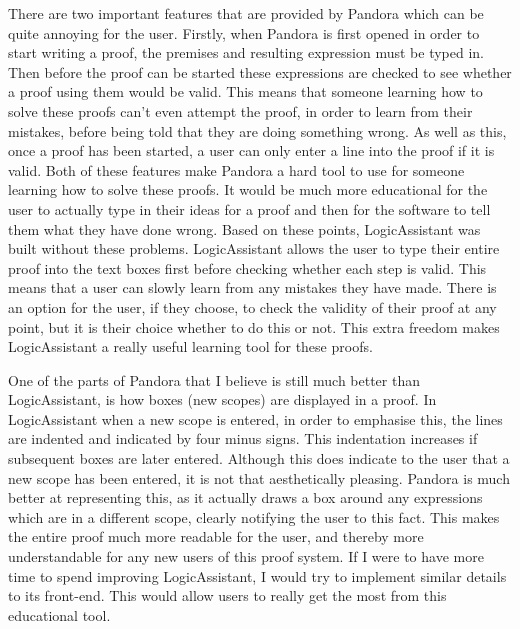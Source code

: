 There are two important features that are provided by Pandora which can be quite annoying for the user. Firstly, when Pandora is first opened in order to start writing a proof, the premises and resulting expression must be typed in. Then before the proof can be started these expressions are checked to see whether a proof using them would be valid. This means that someone learning how to solve these proofs can't even attempt the proof, in order to learn from their mistakes, before being told that they are doing something wrong. As well as this, once a proof has been started, a user can only enter a line into the proof if it is valid. Both of these features make Pandora a hard tool to use for someone learning how to solve these proofs. It would be much more educational for the user to actually type in their ideas for a proof and then for the software to tell them what they have done wrong. Based on these points, LogicAssistant was built without these problems. LogicAssistant allows the user to type their entire proof into the text boxes first before checking whether each step is valid. This means that a user can slowly learn from any mistakes they have made. There is an option for the user, if they choose, to check the validity of their proof at any point, but it is their choice whether to do this or not. This extra freedom makes LogicAssistant a really useful learning tool for these proofs.  

One of the parts of Pandora that I believe is still much better than LogicAssistant, is how boxes (new scopes) are displayed in a proof. In LogicAssistant when a new scope is entered, in order to emphasise this, the lines are indented and indicated by four minus signs. This indentation increases if subsequent boxes are later entered. Although this does indicate to the user that a new scope has been entered, it is not that aesthetically pleasing. Pandora is much better at representing this, as it actually draws a box around any expressions which are in a different scope, clearly notifying the user to this fact. This makes the entire proof much more readable for the user, and thereby more understandable for any new users of this proof system. If I were to have more time to spend improving LogicAssistant, I would try to implement similar details to its front-end. This would allow users to really get the most from this educational tool. 

